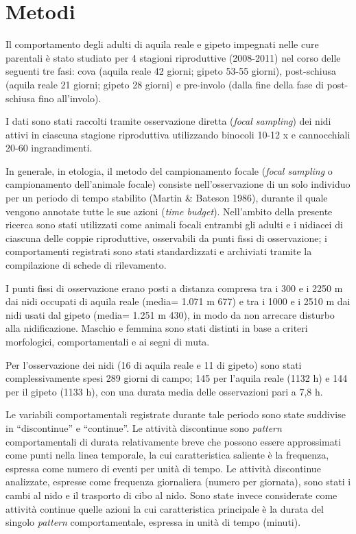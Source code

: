 \section*{Metodi}

Il comportamento degli adulti di aquila reale e gipeto impegnati nelle
cure parentali \`e stato studiato per 4 stagioni riproduttive
(2008-2011) nel corso delle seguenti tre fasi: cova (aquila reale 42
giorni; gipeto 53-55 giorni), post-schiusa (aquila reale 21 giorni;
gipeto 28 giorni) e pre-involo (dalla fine della fase di post-schiusa
fino all{\textquoteright}involo). 

I dati sono stati raccolti tramite osservazione diretta (\textit{focal
sampling}) dei nidi attivi in ciascuna stagione riproduttiva
utilizzando binocoli 10-12 x e cannocchiali 20-60 ingrandimenti. 

In generale, in etologia, il metodo del campionamento focale
(\textit{focal sampling} o campionamento dell{\textquoteright}animale
focale) consiste nell{\textquoteright}osservazione di un solo individuo
per un periodo di tempo stabilito (Martin \& Bateson 1986), durante il
quale vengono annotate tutte le sue azioni (\textit{time budget}).
Nell{\textquoteright}ambito della presente ricerca sono stati
utilizzati come animali focali entrambi gli adulti e i nidiacei di
ciascuna delle coppie riproduttive, osservabili da punti fissi di
osservazione; i comportamenti registrati sono stati standardizzati e
archiviati tramite la compilazione di schede di rilevamento. 

I punti fissi di osservazione erano posti a distanza compresa tra i 300
e i 2250 m dai nidi occupati di aquila reale (media= 1.071 m {\textpm}
677) e tra i 1000 e i 2510 m dai nidi usati dal gipeto (media= 1.251 m
{\textpm} 430), in modo da non arrecare disturbo alla nidificazione.
Maschio e femmina sono stati distinti in base a criteri morfologici,
comportamentali e ai segni di muta. 

Per l{\textquoteright}osservazione dei nidi (16 di aquila reale e 11 di
gipeto) sono stati complessivamente spesi 289 giorni di campo; 145 per
l{\textquoteright}aquila reale (1132 h) e 144 per il gipeto (1133 h),
con una durata media delle osservazioni pari a 7,8 h. 

Le variabili comportamentali registrate durante tale periodo sono state
suddivise in {\textquotedblleft}discontinue{\textquotedblright} e
{\textquotedblleft}continue{\textquotedblright}. Le attivit\`a
discontinue sono \textit{pattern} comportamentali di durata
relativamente breve che possono essere approssimati come punti nella
linea temporale, la cui caratteristica saliente \`e la frequenza,
espressa come numero di eventi per unit\`a di tempo. Le attivit\`a
discontinue analizzate, espresse come frequenza giornaliera (numero per
giornata), sono stati i cambi al nido e il trasporto di cibo al nido.
Sono state invece considerate come attivit\`a continue quelle azioni la
cui caratteristica principale \`e la durata del singolo
\textit{pattern} comportamentale, espressa in unit\`a di tempo
(minuti). 

